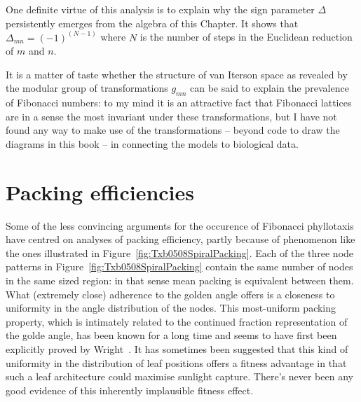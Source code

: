 One definite virtue of this analysis is to explain why the sign parameter $\Delta$ persistently emerges from the algebra of this Chapter. It shows that $\Delta_{mn}=(-1)^{(N-1)}$ where $N$ is the number of steps in the Euclidean reduction of $m$ and $n$. 


It is a matter of taste whether the structure of van Iterson space as revealed by the modular group of transformations $g_{mn}$ can be said to explain the prevalence of Fibonacci numbers: to my mind it is an attractive fact that Fibonacci lattices are in a sense the most invariant under these transformations, but I have not found any way to make use of the transformations -- beyond  code to draw the diagrams in this book -- in connecting the models to biological data. 



\section{Packing efficiencies}
Some of the less convincing arguments for the occurence of Fibonacci phyllotaxis have centred on analyses of packing efficiency, partly because of phenomenon like the ones illustrated in Figure~\ref{fig:Txb0508SpiralPacking}.%
%
Each of the three node patterns in Figure~\ref{fig:Txb0508SpiralPacking} contain the same number of nodes in the same sized region: in that sense mean packing is equivalent between them. What (extremely close) adherence to the golden angle offers is a closeness to uniformity in the angle distribution of the nodes. This most-uniform packing property, which is intimately related to the continued fraction representation of the golde angle, has been known for a long time and seems to have first been explicitly proved by Wright~\cite{wrightMostThoroughUniform1859}. It has sometimes been suggested that this kind of uniformity in the distribution of leaf positions offers a fitness advantage in that such a leaf architecture could maximise sunlight capture. There's never been any good evidence of this inherently implausible fitness effect.

